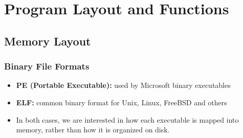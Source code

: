 \documentclass[]{beamer}
\begin{document}
\section{Program Layout and Functions}

\subsection{Memory Layout}

\begin{frame}
  \frametitle{Binary File Formats}
  \begin{itemize}
  \item{\textbf{PE (Portable Executable):} used by Microsoft binary executables}
  \item{\textbf{ELF:} common binary format for Unix, Linux, FreeBSD and others}
  \item In both cases, we are interested in how each executable is
    mapped into memory, rather than how it is organized on disk.
  \end{itemize}
\end{frame}
\end{document}
